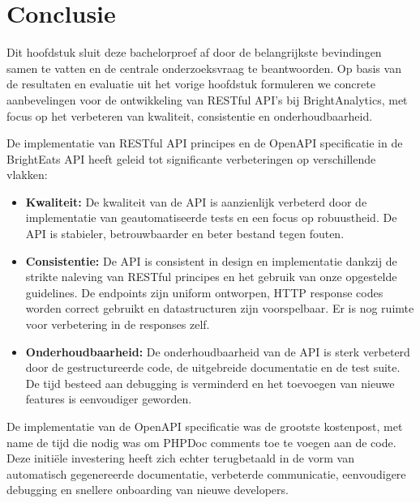
\chapter{Conclusie}%
\label{ch:conclusie}

Dit hoofdstuk sluit deze bachelorproef af door de belangrijkste bevindingen samen te vatten en de centrale onderzoeksvraag te beantwoorden. Op basis van de resultaten en evaluatie uit het vorige hoofdstuk formuleren we concrete aanbevelingen voor de ontwikkeling van RESTful API's bij BrightAnalytics, met focus op het verbeteren van kwaliteit, consistentie en onderhoudbaarheid.

\bigskip

De implementatie van RESTful API principes en de OpenAPI specificatie in de Bright\-Eats API heeft geleid tot significante verbeteringen op verschillende vlakken:

\begin{itemize}
  \item \textbf{Kwaliteit:} De kwaliteit van de API is aanzienlijk verbeterd door de implementatie van geautomatiseerde tests en een focus op robuustheid. De API is stabieler, betrouwbaarder en beter bestand tegen fouten.
  \item \textbf{Consistentie:} De API is consistent in design en implementatie dankzij de strikte naleving van RESTful principes en het gebruik van onze opgestelde guidelines. De endpoints zijn uniform ontworpen, HTTP response codes worden correct gebruikt en datastructuren zijn voorspelbaar. Er is nog ruimte voor verbetering in de responses zelf.
  \item \textbf{Onderhoudbaarheid:} De onderhoudbaarheid van de API is sterk verbeterd door de gestructureerde code, de uitgebreide documentatie en de test suite. De tijd besteed aan debugging is verminderd en het toevoegen van nieuwe features is eenvoudiger geworden.
\end{itemize}

De implementatie van de OpenAPI specificatie was de grootste kostenpost, met name de tijd die nodig was om PHPDoc comments toe te voegen aan de code. Deze initiële investering heeft zich echter terugbetaald in de vorm van automatisch gegenereerde documentatie, verbeterde communicatie, eenvoudigere debugging en snellere onboarding van nieuwe developers.

